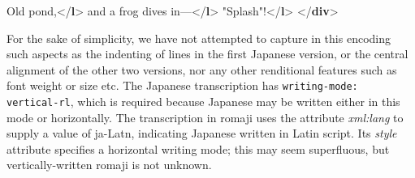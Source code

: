 \begin{shaded}
\hspace*{1em}\mbox{}\newline 
\hspace*{1em}\mbox{}\newline 
{}\mbox{}\newline 
{}\mbox{}\newline 
\hspace*{1em}Old pond,{</\textbf{l}>}\mbox{}\newline 
\hspace*{1em}and a frog dives in—{</\textbf{l}>}\mbox{}\newline 
\hspace*{1em}"Splash"!{</\textbf{l}>}\mbox{}\newline 
{}\mbox{}\newline 
{</\textbf{div}>}\end{shaded}\egroup\par \par
For the sake of simplicity, we have not attempted to capture in this encoding such aspects as the indenting of lines in the first Japanese version, or the central alignment of the other two versions, nor any other renditional features such as font weight or size etc. The Japanese transcription has \texttt{writing-mode: vertical-rl}, which is required because Japanese may be written either in this mode or horizontally. The transcription in romaji uses the attribute {\itshape xml:lang} to supply a value of ja-Latn, indicating Japanese written in Latin script. Its {\itshape style} attribute specifies a horizontal writing mode; this may seem superfluous, but vertically-written romaji is not unknown.
